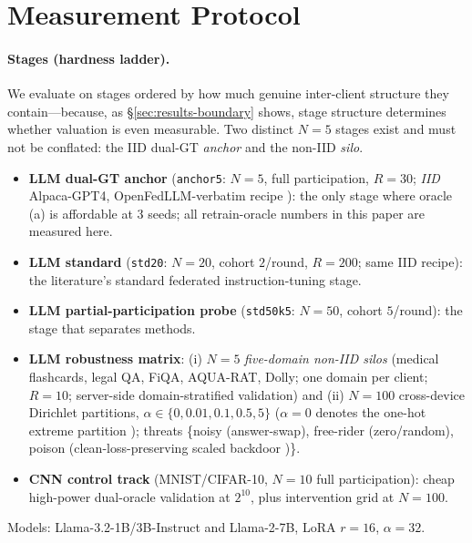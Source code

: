 \section{Measurement Protocol}
\label{sec:protocol}

\paragraph{Stages (hardness ladder).}
We evaluate on stages ordered by how much genuine inter-client structure they
contain---because, as \S\ref{sec:results-boundary} shows, stage structure
determines whether valuation is even measurable. Two distinct $N{=}5$ stages
exist and must not be conflated: the IID dual-GT \emph{anchor} and the non-IID
\emph{silo}.
\begin{itemize}[leftmargin=2em, itemsep=1pt]
\item \textbf{LLM dual-GT anchor} (\texttt{anchor5}: $N{=}5$, full
participation, $R{=}30$; \emph{IID} Alpaca-GPT4, OpenFedLLM-verbatim recipe
\citep{ye2024openfedllm}): the only stage where oracle (a) is affordable at 3
seeds; all retrain-oracle numbers in this paper are measured here.
\item \textbf{LLM standard} (\texttt{std20}: $N{=}20$, cohort $2$/round,
$R{=}200$; same IID recipe): the literature's standard federated
instruction-tuning stage.
\item \textbf{LLM partial-participation probe} (\texttt{std50k5}: $N{=}50$,
cohort $5$/round): the stage that separates methods.
\item \textbf{LLM robustness matrix}: (i) $N{=}5$ \emph{five-domain non-IID
silos} (medical flashcards, legal QA, FiQA, AQUA-RAT, Dolly; one domain per
client; $R{=}10$; server-side domain-stratified validation) and (ii) $N{=}100$
cross-device Dirichlet partitions, $\alpha \in \{0, 0.01, 0.1, 0.5, 5\}$
($\alpha{=}0$ denotes the one-hot extreme partition
); threats \{noisy (answer-swap), free-rider
(zero/random), poison (clean-loss-preserving scaled backdoor
\citep{bagdasaryan2020, xu2024backdoor})\}.
\item \textbf{CNN control track} (MNIST/CIFAR-10, $N{=}10$ full participation):
cheap high-power dual-oracle validation at $2^{10}$, plus intervention grid at
$N{=}100$.
\end{itemize}
Models: Llama-3.2-1B/3B-Instruct and Llama-2-7B, LoRA $r{=}16$, $\alpha{=}32$.


